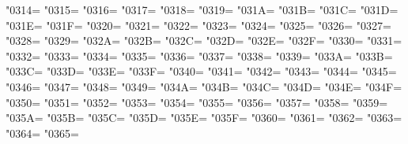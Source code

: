 \XeTeXcharclass"0314=\KclassNum
\XeTeXcharclass"0315=\KclassNum
\XeTeXcharclass"0316=\KclassNum
\XeTeXcharclass"0317=\KclassNum
\XeTeXcharclass"0318=\KclassNum
\XeTeXcharclass"0319=\KclassNum
\XeTeXcharclass"031A=\KclassNum
\XeTeXcharclass"031B=\KclassNum
\XeTeXcharclass"031C=\KclassNum
\XeTeXcharclass"031D=\KclassNum
\XeTeXcharclass"031E=\KclassNum
\XeTeXcharclass"031F=\KclassNum
\XeTeXcharclass"0320=\KclassNum
\XeTeXcharclass"0321=\KclassNum
\XeTeXcharclass"0322=\KclassNum
\XeTeXcharclass"0323=\KclassNum
\XeTeXcharclass"0324=\KclassNum
\XeTeXcharclass"0325=\KclassNum
\XeTeXcharclass"0326=\KclassNum
\XeTeXcharclass"0327=\KclassNum
\XeTeXcharclass"0328=\KclassNum
\XeTeXcharclass"0329=\KclassNum
\XeTeXcharclass"032A=\KclassNum
\XeTeXcharclass"032B=\KclassNum
\XeTeXcharclass"032C=\KclassNum
\XeTeXcharclass"032D=\KclassNum
\XeTeXcharclass"032E=\KclassNum
\XeTeXcharclass"032F=\KclassNum
\XeTeXcharclass"0330=\KclassNum
\XeTeXcharclass"0331=\KclassNum
\XeTeXcharclass"0332=\KclassNum
\XeTeXcharclass"0333=\KclassNum
\XeTeXcharclass"0334=\KclassNum
\XeTeXcharclass"0335=\KclassNum
\XeTeXcharclass"0336=\KclassNum
\XeTeXcharclass"0337=\KclassNum
\XeTeXcharclass"0338=\KclassNum
\XeTeXcharclass"0339=\KclassNum
\XeTeXcharclass"033A=\KclassNum
\XeTeXcharclass"033B=\KclassNum
\XeTeXcharclass"033C=\KclassNum
\XeTeXcharclass"033D=\KclassNum
\XeTeXcharclass"033E=\KclassNum
\XeTeXcharclass"033F=\KclassNum
\XeTeXcharclass"0340=\KclassNum
\XeTeXcharclass"0341=\KclassNum
\XeTeXcharclass"0342=\KclassNum
\XeTeXcharclass"0343=\KclassNum
\XeTeXcharclass"0344=\KclassNum
\XeTeXcharclass"0345=\KclassNum
\XeTeXcharclass"0346=\KclassNum
\XeTeXcharclass"0347=\KclassNum
\XeTeXcharclass"0348=\KclassNum
\XeTeXcharclass"0349=\KclassNum
\XeTeXcharclass"034A=\KclassNum
\XeTeXcharclass"034B=\KclassNum
\XeTeXcharclass"034C=\KclassNum
\XeTeXcharclass"034D=\KclassNum
\XeTeXcharclass"034E=\KclassNum
\XeTeXcharclass"034F=\KclassNum
\XeTeXcharclass"0350=\KclassNum
\XeTeXcharclass"0351=\KclassNum
\XeTeXcharclass"0352=\KclassNum
\XeTeXcharclass"0353=\KclassNum
\XeTeXcharclass"0354=\KclassNum
\XeTeXcharclass"0355=\KclassNum
\XeTeXcharclass"0356=\KclassNum
\XeTeXcharclass"0357=\KclassNum
\XeTeXcharclass"0358=\KclassNum
\XeTeXcharclass"0359=\KclassNum
\XeTeXcharclass"035A=\KclassNum
\XeTeXcharclass"035B=\KclassNum
\XeTeXcharclass"035C=\KclassNum
\XeTeXcharclass"035D=\KclassNum
\XeTeXcharclass"035E=\KclassNum
\XeTeXcharclass"035F=\KclassNum
\XeTeXcharclass"0360=\KclassNum
\XeTeXcharclass"0361=\KclassNum
\XeTeXcharclass"0362=\KclassNum
\XeTeXcharclass"0363=\KclassNum
\XeTeXcharclass"0364=\KclassNum
\XeTeXcharclass"0365=\KclassNum
